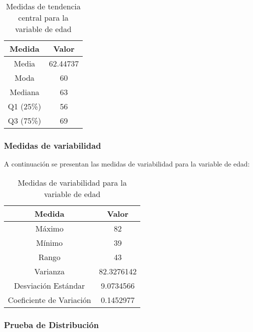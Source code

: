 \documentclass[a4paper,12pt]{article}
\begin{document}
    \begin{table}[h!]
        \centering
        \begin{tabular}{|c|c|}
            \hline
            \textbf{Medida} & \textbf{Valor} \\
            \hline
            Media & 62.44737 \\
            \hline
            Moda & 60 \\
            \hline
            Mediana & 63 \\
            \hline
            Q1 (25\%) & 56 \\
            \hline
            Q3 (75\%) & 69 \\
            \hline
        \end{tabular}
        \caption{Medidas de tendencia central para la variable de edad}
        \label{tab:medidas_tendencia_central_edad}
    \end{table}
    
    \subsubsection*{Medidas de variabilidad}
    
    A continuación se presentan las medidas de variabilidad para la variable de edad:
    
    \begin{table}[h!]
        \centering
        \begin{tabular}{|c|c|}
            \hline
            \textbf{Medida} & \textbf{Valor} \\
            \hline
            Máximo & 82 \\
            \hline
            Mínimo & 39 \\
            \hline
            Rango & 43 \\
            \hline
            Varianza & 82.3276142 \\
            \hline
            Desviación Estándar & 9.0734566 \\
            \hline
            Coeficiente de Variación & 0.1452977 \\
            \hline
        \end{tabular}
        \caption{Medidas de variabilidad para la variable de edad}
        \label{tab:medidas_variabilidad_edad}
    \end{table}

    \subsubsection*{Prueba de Distribución}
\end{document}
